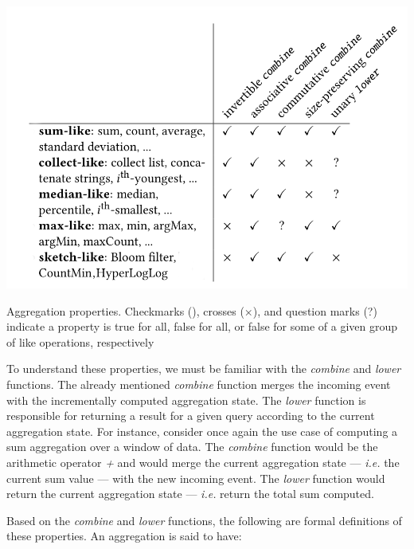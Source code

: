 \begin{table}[!htb]
    \begin{center}
      \includegraphics[scale=0.4]{figures/aggregation-operations-properties.png}
      \caption[Aggregation properties]{Aggregation properties. Checkmarks (\checkmark), crosses ($\times$), and question marks (?) indicate a property is true for all, false for all, or false for some of a given group of like operations, respectively}
      \label{tbl:aggregations-properties}
    \end{center}
\end{table}

To understand these properties, we must be familiar with the \textit{combine} and \textit{lower} functions. The already mentioned \textit{combine} function merges the incoming event with the incrementally computed aggregation state. The \textit{lower} function is responsible for returning a result for a given query according to the current aggregation state. For instance, consider once again the use case of computing a sum aggregation over a window of data. The \textit{combine} function would be the arithmetic operator \textit{+} and would merge the current aggregation state --- \textit{i.e.} the current sum value --- with the new incoming event. The \textit{lower} function would return the current aggregation state --- \textit{i.e.} return the total sum computed.

Based on the \textit{combine} and \textit{lower} functions, the following are formal definitions of these properties. An aggregation is said to have:

